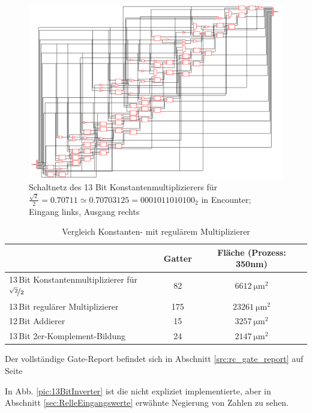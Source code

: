 \begin{figure}[!ht]
\centering  
  \includegraphics[width=1\textwidth]{img/13Bit_Konstantenmultiplizierer_neu.png}
  \caption{Schaltnetz des 13 Bit Konstantenmultiplizierers für $\frac{\sqrt{2}}{2} = 0.70711 \simeq 0.70703125 = 0001011010100_2$ in Encounter; Eingang links, Ausgang rechts}
  \label{pic:Konstantenmultiplizierer}
\end{figure}




\begin{table}[!ht]
\centering
 \caption{Vergleich Konstanten- mit regulärem Multiplizierer}
 \label{tab:VergleichMultiplizierer}
 \begin{tabular}{lcc}
 \hline
				&Gatter  	&Fläche (Prozess: 350nm) \\
  \hline	
  13\,Bit Konstantenmultiplizierer für $\nicefrac{\sqrt{2}}{2}$	& 82		& $\SI{6612}{\um^2}$ \\
  13\,Bit regulärer Multiplizierer				& 175		& $\SI{23261}{\um^2}$\\
  12\,Bit Addierer						& 15		& $\SI{3257}{\um^2}$\\
  13\,Bit 2er-Komplement-Bildung				& 24		& $\SI{2147}{\um^2}$\\
  \hline
 \end{tabular}
\end{table}


Der vollständige Gate-Report befindet sich in Abschnitt \ref{src:rc_gate_report} auf Seite \pageref{src:rc_gate_report}





In Abb. \ref{pic:13BitInverter} ist die nicht expliziet implementierte, aber in Abschnitt \ref{sec:RelleEingangswerte} erwähnte Negierung von Zahlen zu sehen.

